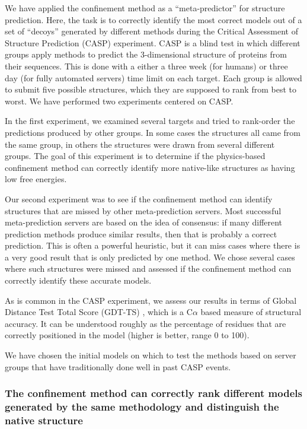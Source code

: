 \documentclass[12pt]{article}
\begin{document}
We have applied the confinement method as a ``meta-predictor'' for structure prediction. Here, the
task is to correctly identify the most correct models out of a set of ``decoys'' generated by
different methods during the Critical Assessment of Structure Prediction (CASP) experiment. CASP is
a blind test in which different groups apply methods to predict the 3-dimensional structure of
proteins from their sequences. This is done with a either a three week (for humans) or three day
(for fully automated servers) time limit on each target. Each group is allowed to submit five
possible structures, which they are supposed to rank from best to worst. We have performed two
experiments centered on CASP.

In the first experiment, we examined several targets and tried to rank-order the predictions
produced by other groups. In some cases the structures all came from the same group, in others the
structures were drawn from several different groups. The goal of this experiment is to determine if
the physics-based confinement method can correctly identify more native-like structures as having
low free energies.

Our second experiment was to see if the confinement method can identify structures that are missed
by other meta-prediction servers. Most successful meta-prediction servers are based on the idea of
consensus: if many different prediction methods produce similar results, then that is probably a
correct prediction. This is often a powerful heuristic, but it can miss cases where there is a very
good result that is only predicted by one method. We chose several cases where such structures were
missed and assessed if the confinement method can correctly identify these accurate models.

As is common in the CASP experiment, we assess our results in terms of Global Distance Test Total
Score (GDT-TS) \cite{Zemla2003}, which is a C$\alpha$ based measure of structural accuracy. It can
be understood roughly as the percentage of residues that are correctly positioned in the model
(higher is better, range 0 to 100).

We have chosen the initial models on which to test the methods based on server groups that have
traditionally done well in past CASP events.

\subsubsection{The confinement method can correctly rank different models generated by the same methodology
and distinguish the native structure}
\end{document}
